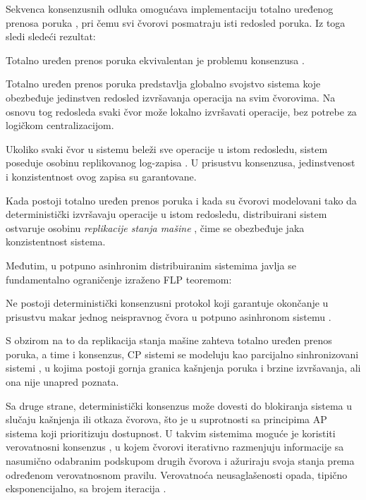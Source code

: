 Sekvenca konsenzusnih odluka omogućava implementaciju totalno uređenog prenosa poruka  \cite{defago2004total}, pri čemu svi čvorovi posmatraju isti redosled poruka. Iz toga sledi sledeći rezultat:
\begin{teorema}
Totalno uređen prenos poruka ekvivalentan je problemu konsenzusa \cite{chandra1996unreliable}.
\end{teorema}

Totalno uređen prenos poruka predstavlja globalno svojstvo sistema koje obezbeđuje jedinstven redosled izvršavanja operacija na svim čvorovima. Na osnovu tog redosleda svaki čvor može lokalno izvršavati operacije, bez potrebe za logičkom centralizacijom.

Ukoliko svaki čvor u sistemu beleži sve operacije u istom redosledu, sistem poseduje osobinu replikovanog log-zapisa  \cite{wang2015building}. U prisustvu konsenzusa, jedinstvenost i konzistentnost ovog zapisa su garantovane.

Kada postoji totalno uređen prenos poruka i kada su čvorovi modelovani tako da deterministički izvršavaju operacije u istom redosledu, distribuirani sistem ostvaruje osobinu \textit{replikacije stanja mašine}  \cite{schneider1990implementing}, čime se obezbeđuje jaka konzistentnost sistema.

Međutim, u potpuno asinhronim distribuiranim sistemima javlja se fundamentalno ograničenje izraženo FLP teoremom:
\begin{teorema}
Ne postoji deterministički konsenzusni protokol koji garantuje okončanje u prisustvu makar jednog neispravnog čvora u potpuno asinhronom sistemu \cite{fischer1985impossibility}.
\end{teorema}

S obzirom na to da replikacija stanja mašine zahteva totalno uređen prenos poruka, a time i konsenzus, CP sistemi se modeluju kao parcijalno sinhronizovani sistemi \cite{dwork1988consensus}, u kojima postoji gornja granica kašnjenja poruka i brzine izvršavanja, ali ona nije unapred poznata.

Sa druge strane, deterministički konsenzus može dovesti do blokiranja sistema u slučaju kašnjenja ili otkaza čvorova, što je u suprotnosti sa principima AP sistema koji prioritizuju dostupnost. U takvim sistemima moguće je koristiti verovatnosni konsenzus , u kojem čvorovi iterativno razmenjuju informacije sa nasumično odabranim podskupom drugih čvorova i ažuriraju svoja stanja prema određenom verovatnosnom pravilu. Verovatnoća neusaglašenosti opada, tipično eksponencijalno, sa brojem iteracija \cite{fagnani2008randomized}.

